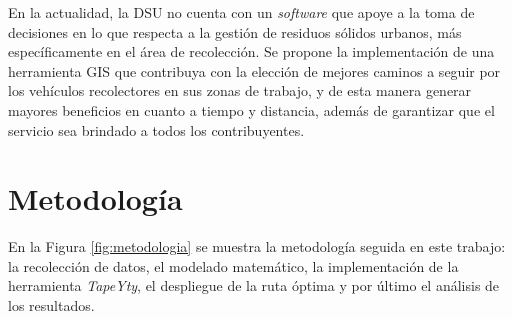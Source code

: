 \documentclass[a0,portrait, final]{a0poster}
\begin{document}
\begin{multicols}{2}
En la actualidad, la DSU no cuenta con un \textit{software} que apoye a la toma de decisiones en lo que respecta a la gestión de residuos sólidos urbanos, más específicamente en el área de recolección. Se propone la implementación de una herramienta GIS que contribuya con la elección de mejores caminos a seguir por los vehículos recolectores en sus zonas de trabajo, y de esta manera generar mayores beneficios en cuanto a tiempo y distancia, además de garantizar que el servicio sea brindado a todos los contribuyentes.


\section*{Metodología}
En la Figura \ref{fig:metodologia} se muestra la metodología seguida en este trabajo: la recolección de datos, el modelado matemático, la implementación de la herramienta \textit{TapeYty}, el despliegue de la ruta óptima y por último el análisis de los resultados.


\end{multicols}
\end{document}
